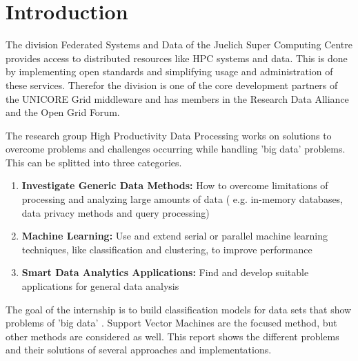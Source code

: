 
\section{Introduction}

The division Federated Systems and Data of the Juelich Super Computing
Centre provides access to distributed resources like HPC systems and
data. This is done by implementing open standards and simplifying
usage and administration of these services. Therefor the division
is one of the core development partners of the UNICORE Grid middleware
and has members in the Research Data Alliance and the Open Grid Forum.

The research group High Productivity Data Processing works on solutions
to overcome problems and challenges occurring while handling 'big
data' problems. This can be splitted into three categories. 

\begin{enumerate} 	\item{\textbf{Investigate Generic Data Methods:}} How to overcome limitations of processing and analyzing large amounts of data ( e.g. in-memory databases, data privacy methods and query processing) 	\item{\textbf{Machine Learning:}} Use and extend serial or parallel machine learning techniques, like classification and clustering, to improve performance 	\item{\textbf{Smart Data Analytics Applications:}} Find and develop suitable applications for general data analysis 
\end{enumerate}

The goal of the internship is to build classification models for data
sets that show problems of 'big data' . Support Vector Machines are
the focused method, but other methods are considered as well. This
report shows the different problems and their solutions of several
approaches and implementations. 
